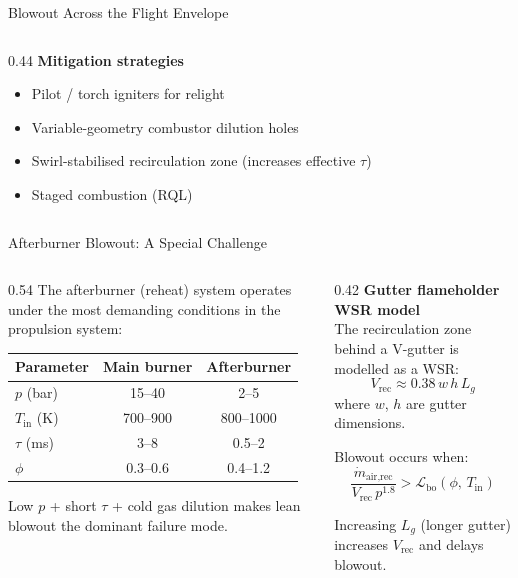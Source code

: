 \documentclass[12pt,aspectratio=169]{beamer}
\newcommand{\taures}{\tau}
\newcommand{\Vr}{V}
\newcommand{\mdot}{\dot{m}}
\begin{document}
\begin{frame}{Blowout Across the Flight Envelope}
\begin{columns}
\begin{column}{0.44\textwidth}
      \medskip
      \textbf{Mitigation strategies}
      \begin{itemize}
        \item Pilot / torch igniters for relight
        \item Variable-geometry combustor dilution holes
        \item Swirl-stabilised recirculation zone
              (increases effective $\taures$)
        \item Staged combustion (RQL)
      \end{itemize}
    \end{column}
  \end{columns}
\end{frame}

\begin{frame}{Afterburner Blowout: A Special Challenge}

  \begin{columns}[t]
    \begin{column}{0.54\textwidth}
      The afterburner (reheat) system operates under the most demanding
      conditions in the propulsion system:

      \medskip
      \begin{tabular}{lcc}
        \toprule
        Parameter & Main burner & Afterburner \\
        \midrule
        $p$ (bar) & 15--40 & 2--5 \\
        $T_{\text{in}}$ (K) & 700--900 & 800--1000 \\
        $\taures$ (ms) & 3--8 & 0.5--2 \\
        $\phi$ & 0.3--0.6 & 0.4--1.2 \\
        \bottomrule
      \end{tabular}

      \medskip
      Low $p$ + short $\taures$ + cold gas dilution makes lean blowout
      the dominant failure mode.
    \end{column}
    \begin{column}{0.42\textwidth}
      \textbf{Gutter flameholder WSR model}\\[6pt]
      The recirculation zone behind a V-gutter is modelled as a WSR:
      \[
        \Vr_{\text{rec}} \approx 0.38\,w\,h\,L_g
      \]
      where $w$, $h$ are gutter dimensions.

      \medskip
      Blowout occurs when:
      \[
        \frac{\mdot_{\text{air,rec}}}
             {\Vr_{\text{rec}}\,p^{1.8}}
        > \mathcal{L}_{\text{bo}}(\phi,\,T_{\text{in}})
      \]

      Increasing $L_g$ (longer gutter) increases $\Vr_{\text{rec}}$
      and delays blowout.
    \end{column}
  \end{columns}
\end{frame}
\end{document}
